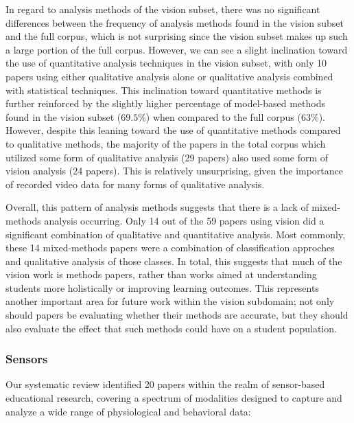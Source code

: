 \documentclass[manuscript,screen,review]{acmart}
\begin{document}
In regard to analysis methods of the vision subset, there was no significant differences between the frequency of analysis methods found in the vision subset and the full corpus, which is not surprising since the vision subset makes up such a large portion of the full corpus. However, we can see a slight inclination toward the use of quantitative analysis techniques in the vision subset, with only 10 papers using either qualitative analysis alone or qualitative analysis combined with statistical techniques. This inclination toward quantitative methods is further reinforced by the slightly higher percentage of model-based methods found in the vision subset ($69.5\%$) when compared to the full corpus ($63\%$). However, despite this leaning toward the use of quantitative methods compared to qualitative methods, the majority of the papers in the total corpus which utilized some form of qualitative analysis (29 papers) also used some form of vision analysis (24 papers). This is relatively unsurprising, given the importance of recorded video data for many forms of qualitative analysis.

Overall, this pattern of analysis methods suggests that there is a lack of mixed-methods analysis occurring. Only 14 out of the 59 papers using vision did a significant combination of qualitative and quantitative analysis. Most commonly, these 14 mixed-methods papers were a combination of classification approches and qualitative analysis of those classes. In total, this suggests that much of the vision work is methods papers, rather than works aimed at understanding students more holistically or improving learning outcomes. This represents another important area for future work within the vision subdomain; not only should papers be evaluating whether their methods are accurate, but they should also evaluate the effect that such methods could have on a student population. 


    
\subsubsection{Sensors}


Our systematic review identified 20 papers within the realm of sensor-based educational research, covering a spectrum of modalities designed to capture and analyze a wide range of physiological and behavioral data:
\end{document}

